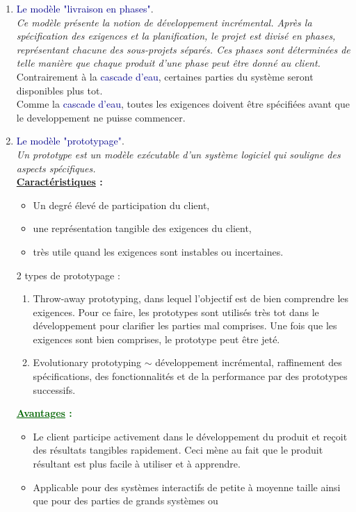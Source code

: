 \documentclass{article}
\newcommand{\gre}[1]{\textcolor{darkgreen}{#1}}
\newcommand{\blu}[1]{\textcolor{darkblue}{#1}}
\newcommand{\ora}[1]{\textcolor{darko}{#1}}
\begin{document}
\begin{sffamily}
\begin{enumerate}
\item \blu{Le modèle "livraison en phases"}.\\
\textit{Ce modèle présente la notion de développement incrémental. Après la spécification des exigences et la planification, le 
projet est divisé en phases, représentant chacune des sous-projets séparés. Ces phases sont déterminées de telle manière que 
chaque produit d'une phase peut être donné au client.}\\
Contrairement à la \blu{cascade d'eau}, certaines parties du système seront disponibles plus tot.\\
Comme la \blu{cascade d'eau}, toutes les exigences doivent être spécifiées avant que le developpement ne puisse commencer.

\item \blu{Le modèle "prototypage"}.\\
\textit{Un prototype est un modèle exécutable d'un système logiciel qui souligne des aspects spécifiques.}\\
\textbf{\underline{Caractéristiques} :}
	\begin{itemize}
	\item Un degré élevé de participation du client,
	\item une représentation tangible des exigences du client,
	\item très utile quand les exigences sont instables ou incertaines.
	\end{itemize}
2 types de prototypage :
	\begin{enumerate}
	\item \ora{Throw-away prototyping}, dans lequel l'objectif est de bien comprendre les exigences. Pour ce faire, les 
	prototypes sont utilisés très tot dans le développement pour clarifier les parties mal comprises. Une fois que les exigences 
	sont bien comprises, le prototype peut être jeté.
	\item \ora{Evolutionary prototyping} $\sim$ développement incrémental, raffinement des spécifications, des fonctionnalités 
	et de la performance par des prototypes successifs.
	\end{enumerate}
\gre{\textbf{\underline{Avantages} :}}
	\begin{itemize}
	\item Le client participe activement dans le développement du produit et reçoit des résultats tangibles rapidement. Ceci 
	mène au fait que le produit résultant est plus facile à utiliser et à apprendre.
	\item Applicable pour des systèmes interactifs de petite à moyenne taille ainsi que pour des parties de grands systèmes ou 

\end{itemize}
\end{enumerate}
\end{sffamily}
\end{document}
